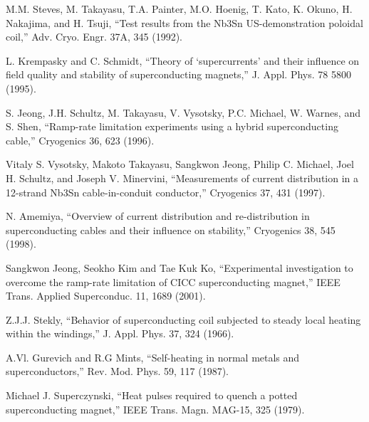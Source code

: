 \noindent [6.57] M.M. Steves, M. Takayasu, T.A. Painter, M.O. Hoenig, T. Kato, K. Okuno, H.
Nakajima, and H. Tsuji, ``Test results from the Nb3Sn US-demonstration poloidal
coil,” Adv. Cryo. Engr. 37A, 345 (1992).

\noindent [6.58] L. Krempasky and C. Schmidt, ``Theory of ‘supercurrents’ and their influence on
field quality and stability of superconducting magnets,” J. Appl. Phys. 78 5800 (1995).

\noindent [6.59] S. Jeong, J.H. Schultz, M. Takayasu, V. Vysotsky, P.C. Michael, W. Warnes, and
S. Shen, ``Ramp-rate limitation experiments using a hybrid superconducting cable,”
Cryogenics 36, 623 (1996).

\noindent [6.60] Vitaly S. Vysotsky, Makoto Takayasu, Sangkwon Jeong, Philip C. Michael, Joel
H. Schultz, and Joseph V. Minervini, ``Measurements of current distribution in a
12-strand Nb3Sn cable-in-conduit conductor,” Cryogenics 37, 431 (1997).

\noindent [6.61] N. Amemiya, ``Overview of current distribution and re-distribution in superconducting cables and their influence on stability,” Cryogenics 38, 545 (1998).

\noindent [6.62] Sangkwon Jeong, Seokho Kim and Tae Kuk Ko, ``Experimental investigation to
overcome the ramp-rate limitation of CICC superconducting magnet,” IEEE Trans.
Applied Superconduc. 11, 1689 (2001).

\noindent [6.63] Z.J.J. Stekly, ``Behavior of superconducting coil subjected to steady local heating
within the windings,” J. Appl. Phys. 37, 324 (1966).

\noindent [6.64] A.Vl. Gurevich and R.G Mints, ``Self-heating in normal metals and superconductors,” Rev. Mod. Phys. 59, 117 (1987).

\noindent [6.65] Michael J. Superczynski, ``Heat pulses required to quench a potted superconducting magnet,” IEEE Trans. Magn. MAG-15, 325 (1979).
